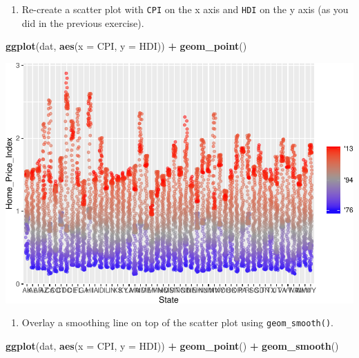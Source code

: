 \documentclass[
]{book}
\newenvironment{Shaded}{\begin{snugshade}}{\end{snugshade}}
\newcommand{\DataTypeTok}[1]{\textcolor[rgb]{0.13,0.29,0.53}{#1}}
\newcommand{\KeywordTok}[1]{\textcolor[rgb]{0.13,0.29,0.53}{\textbf{#1}}}
\newcommand{\NormalTok}[1]{#1}
\newcommand{\OperatorTok}[1]{\textcolor[rgb]{0.81,0.36,0.00}{\textbf{#1}}}
\newcommand{\StringTok}[1]{\textcolor[rgb]{0.31,0.60,0.02}{#1}}
\providecommand{\tightlist}{%
  \setlength{\itemsep}{0pt}\setlength{\parskip}{0pt}}
\begin{document}
\begin{alert}

\begin{enumerate}
\def\labelenumi{\arabic{enumi}.}
\tightlist
\item
  Re-create a scatter plot with \texttt{CPI} on the x axis and \texttt{HDI} on the y axis (as you did in the previous exercise).
\end{enumerate}

\begin{Shaded}
\begin{Highlighting}[]
\KeywordTok{ggplot}\NormalTok{(dat, }\KeywordTok{aes}\NormalTok{(}\DataTypeTok{x =}\NormalTok{ CPI, }\DataTypeTok{y =}\NormalTok{ HDI)) }\OperatorTok{+}
\StringTok{  }\KeywordTok{geom\_point}\NormalTok{()}
\end{Highlighting}
\end{Shaded}

\includegraphics{R/Rgraphics/figures/unnamed-chunk-176-1.pdf}

\begin{enumerate}
\def\labelenumi{\arabic{enumi}.}
\setcounter{enumi}{1}
\tightlist
\item
  Overlay a smoothing line on top of the scatter plot using \texttt{geom\_smooth()}.
\end{enumerate}

\begin{Shaded}
\begin{Highlighting}[]
\KeywordTok{ggplot}\NormalTok{(dat, }\KeywordTok{aes}\NormalTok{(}\DataTypeTok{x =}\NormalTok{ CPI, }\DataTypeTok{y =}\NormalTok{ HDI)) }\OperatorTok{+}
\StringTok{  }\KeywordTok{geom\_point}\NormalTok{() }\OperatorTok{+}
\StringTok{  }\KeywordTok{geom\_smooth}\NormalTok{()}
\end{Highlighting}
\end{Shaded}


\end{alert}
\end{document}
